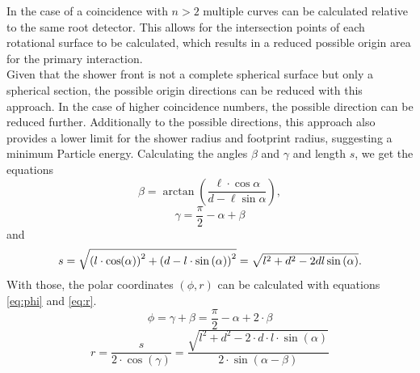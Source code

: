 \documentclass[abstract,toc,los,lof,english,10pt,glossary,acronyms]{jluthesis}
\begin{document}
In the case of a coincidence with $n>2$ multiple curves can be calculated relative to the same root detector. This allows for the intersection points of each rotational surface to be calculated, which results in a reduced possible origin area for the primary interaction. \\
Given that the shower front is not a complete spherical surface but only a spherical section, the possible origin directions can be reduced with this approach. In the case of higher coincidence numbers, the possible direction can be reduced further. Additionally to the possible directions, this approach also provides a lower limit for the shower radius and footprint radius, suggesting a minimum Particle energy.
Calculating the angles $\beta$ and $\gamma$ and length $s$, we get the equations
\begin{equation*}
	\beta = \arctan\left(\frac{\ell\cdot\cos\alpha}{d - \ell\sin\alpha}\right),
\end{equation*}
\begin{equation*}
	\gamma = \frac{\pi}{2} - \alpha + \beta
\end{equation*}
and
\begin{equation*}
	s = \sqrt{\left(l\cdot\cos\hspace{-2pt}\left(\alpha\right)\right)^2 + \left(d - l\cdot\sin\left(\alpha\right)\right)^2} = \sqrt{l^2 + d^2 - 2dl\sin\left(\alpha\right)}.
\end{equation*}
With those, the polar coordinates $(\phi, r)$ can be calculated with equations \ref{eq:phi} and \ref{eq:r}.
\begin{equation}\label{eq:phi}
	\phi = \gamma + \beta = \frac{\pi}{2} - \alpha + 2\cdot\beta
\end{equation}
\begin{equation}\label{eq:r}
	r = \frac{s}{2\cdot\cos\left(\gamma\right)} = \frac{\sqrt{l^2 + d^2 - 2{\cdot}d{\cdot}l{\cdot}\sin\left(\alpha\right)}}{2\cdot\sin\left(\alpha - \beta\right)}
\end{equation}
\end{document}
